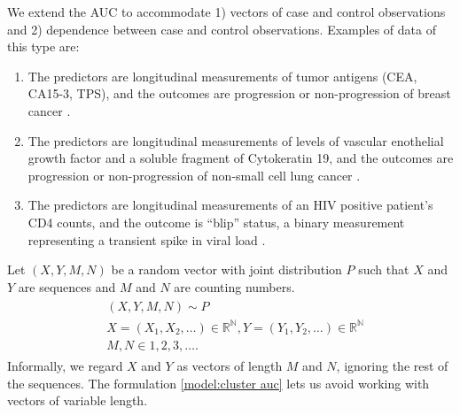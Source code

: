 \documentclass[12pt]{article}
\renewcommand{\P}{P}
\begin{document}
We extend the AUC to accommodate 1) vectors of case and control
observations and 2) dependence between case and control
observations. Examples of data of this type are:
\begin{enumerate}
\item The predictors are longitudinal measurements of tumor antigens
  (CEA, CA15-3, TPS), and the outcomes are progression or non-progression
  of breast cancer \citep{emir2000}.
\item The predictors are longitudinal measurements of levels of vascular
enothelial growth factor and a soluble fragment of Cytokeratin
19, and the outcomes are progression or non-progression of non-small cell
lung cancer \citep{wu2011}.
\item The predictors are longitudinal measurements of an HIV positive patient's CD4 counts, and the outcome is ``blip'' status, a binary measurement representing a transient spike in viral load \citep{michael2019}.
\end{enumerate}

Let $(X,Y,M,N)$ be a random vector
with joint distribution $\P$  such that $X$ and $Y$ are sequences and $M$ and $N$ are counting numbers.%
\begin{gather}
\begin{aligned}\label{model:cluster auc}
  &(X,Y,M,N) \sim \P\\
  &X=(X_1,X_2,\ldots)\in\mathbb{R}^\mathbb{N}, Y=(Y_1,Y_2,\ldots)\in\mathbb{R}^\mathbb{N}\\
  &M,N \in 1,2,3,\ldots .
\end{aligned}
\end{gather}
Informally, we regard $X$ and $Y$ as vectors of length $M$ and $N$, ignoring the rest of the sequences. The formulation \eqref{model:cluster auc} lets us avoid working with vectors of variable length.
\end{document}
